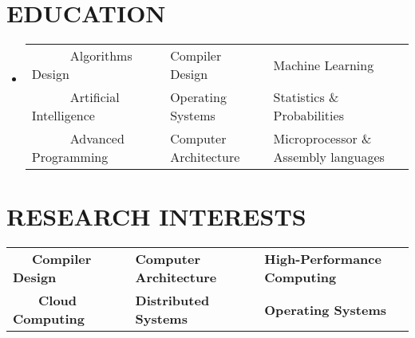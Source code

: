 \documentclass[11pt,a4paper,sans]{moderncv}        %
\begin{document}
\makecvtitle 
\vspace{-20pt}


\section{EDUCATION}

\vspace{4pt}

\begin{itemize}

\item{}

\small{
    \begin{tabular}
        {l@{\hskip 5mm}l@{\hskip 5mm}l}
        ~~~~~~Algorithms Design & Compiler
               Design & Machine Learning \\ 
        ~~~~~~Artificial Intelligence & Operating Systems & Statistics \& Probabilities \\
        ~~~~~~Advanced Programming & Computer Architecture & Microprocessor \& Assembly languages \\
    \end{tabular}
    \medskip
} %

\end{itemize}
\section{RESEARCH INTERESTS}
\vspace{6pt}
\small{
    \begin{tabular}
        {l@{\hskip 14mm}l@{\hskip 14mm}l}
        \vspace{6pt}
        ~~~\textbf{\large Compiler Design} & \textbf{\large Computer Architecture} & \textbf{\large High-Performance Computing} \\
        ~~~~\textbf{\large Cloud Computing} &  \textbf{\large Distributed Systems} &
        \textbf{\large Operating Systems}
    \end{tabular}
    \medskip
} %
\end{document}
